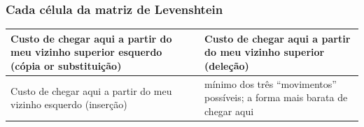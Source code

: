 \documentclass[compress]{beamer}
\begin{document}
\begin{frame}
\frametitle{Cada célula da matriz de Levenshtein}

\bigskip

\begin{tabular}{|l|l|}

\hline
\parbox{4cm}{Custo de chegar aqui a partir do meu vizinho superior 
esquerdo (cópia or substituição)} &
\parbox{4cm}{Custo de chegar aqui a partir do meu vizinho superior 
(deleção)}\\\hline
\parbox{4cm}{Custo de chegar aqui a partir do meu vizinho esquerdo (inserção)} &
\parbox{4cm}{mínimo dos três ``movimentos'' possíveis; a forma mais barata de 
chegar aqui
} \\\hline

\end{tabular}

\end{frame}

\end{document}
